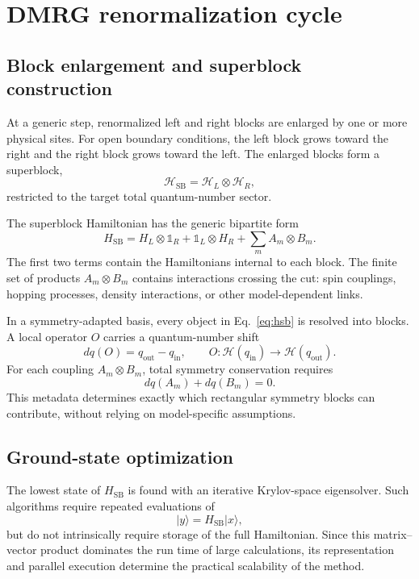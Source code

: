 \documentclass[11pt,a4paper]{article}
\newcommand{\ket}[1]{\lvert #1\rangle}
\newcommand{\Hil}{\mathcal H}
\newcommand{\Id}{\mathbb 1}
\begin{document}
\section{DMRG renormalization cycle}

\subsection{Block enlargement and superblock construction}

At a generic step, renormalized left and right blocks are enlarged by one or
more physical sites.  For open boundary conditions, the left block grows
toward the right and the right block grows toward the left.  The enlarged
blocks form a superblock,
\begin{equation}
  \Hil_{\mathrm{SB}}=\Hil_L\otimes\Hil_R,
\end{equation}
restricted to the target total quantum-number sector.

The superblock Hamiltonian has the generic bipartite form
\begin{equation}
  H_{\mathrm{SB}}
  =H_L\otimes\Id_R
   +\Id_L\otimes H_R
   +\sum_m A_m\otimes B_m.
  \label{eq:hsb}
\end{equation}
The first two terms contain the Hamiltonians internal to each block.  The
finite set of products $A_m\otimes B_m$ contains interactions crossing the
cut: spin couplings, hopping processes, density interactions, or other
model-dependent links.

In a symmetry-adapted basis, every object in Eq.~\eqref{eq:hsb} is resolved
into blocks.  A local operator $O$ carries a quantum-number shift
\begin{equation}
  dq(O)=q_{\mathrm{out}}-q_{\mathrm{in}},
  \qquad
  O:\Hil(q_{\mathrm{in}})\longrightarrow\Hil(q_{\mathrm{out}}).
\end{equation}
For each coupling $A_m\otimes B_m$, total symmetry conservation requires
\begin{equation}
  dq(A_m)+dq(B_m)=0.
  \label{eq:dq-conservation}
\end{equation}
This metadata determines exactly which rectangular symmetry blocks can
contribute, without relying on model-specific assumptions.

\subsection{Ground-state optimization}

The lowest state of $H_{\mathrm{SB}}$ is found with an iterative Krylov-space
eigensolver.  Such algorithms require repeated evaluations of
\begin{equation}
  \ket{y}=H_{\mathrm{SB}}\ket{x},
\end{equation}
but do not intrinsically require storage of the full Hamiltonian.  Since this
matrix--vector product dominates the run time of large calculations, its
representation and parallel execution determine the practical scalability of
the method.
\end{document}
